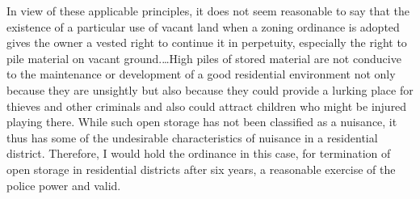 In view of these applicable principles, it does not seem reasonable to say that
the existence of a particular use of vacant land when a zoning ordinance is
adopted gives the owner a vested right to continue it in perpetuity, especially
the right to pile material on vacant ground.\ldots High piles of stored material
are not conducive to the maintenance or development of a good residential
environment not only because they are unsightly but also because they could
provide a lurking place for thieves and other criminals and also could attract
children who might be injured playing there. While such open storage has not
been classified as a nuisance, it thus has some of the undesirable
characteristics of nuisance in a residential district. Therefore, I would hold
the ordinance in this case, for termination of open storage in residential
districts after six years, a reasonable exercise of the police power and valid.

